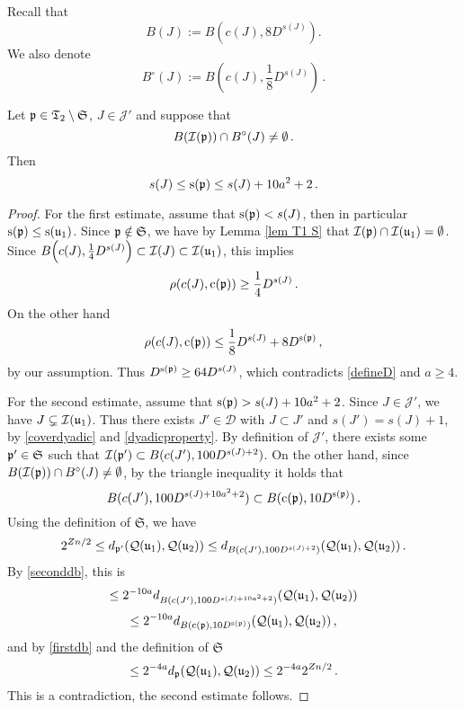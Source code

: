 {    Recall that
    \begin{equation*}
        B(J) := B(c(J), 8D^{s(J)}).
    \end{equation*}
    We also denote
    \begin{equation*}
     B^\circ{}(J) := B(c(J), \frac{1}{8}D^{s(J)})\, .    \end{equation*}


    \begin{lemma}
        \label{lem sep tree aux 2}
        Let $\mathfrak p \in \mathfrak T_2 \setminus \mathfrak{S}$, $J \in \mathcal{J}'$ and suppose that
        $$
           B(\mathcal{I}(\mathfrak p)) \cap B^\circ(J)  \ne \emptyset\,.
        $$
        Then
        $$
            s(J) \le \mathrm{s}(\mathfrak p) \le s(J) + 10a^2 + 2\,.
        $$
    \end{lemma}

    \begin{proof}
        For the first estimate, assume that $\mathrm{s}(\mathfrak p) < s(J)$, then in particular $\mathrm{s}(\mathfrak p) \le \mathrm{s}(\mathfrak u_1)$. Since $\mathfrak p \notin \mathfrak{S}$, we have by Lemma \ref{lem T1 S} that $\mathcal{I}(\mathfrak p) \cap \mathcal{I}(\mathfrak u_1) = \emptyset$.
        Since $B\Big(c(J), \frac{1}{4} D^{s(J)}\Big) \subset \mathcal{I}(J) \subset \mathcal{I}(\mathfrak u_1)$, this implies
        $$
            \rho(c(J), \mathrm{c}(\mathfrak p)) \ge \frac{1}{4}D^{s(J)}\,.
        $$
        On the other hand
        $$
            \rho(c(J), \mathrm{c}(\mathfrak p)) \le \frac{1}{8} D^{s(J)} + 8 D^{\mathrm{s}(\mathfrak p)}\,,
        $$
        by our assumption. Thus $D^{\mathrm{s}(\mathfrak p)} \ge 64 D^{s(J)}$, which contradicts \eqref{defineD} and $a \ge 4$.

        For the second estimate, assume that $\mathrm{s}(\mathfrak p) > s(J) +10a^2 + 2$. Since $J \in \mathcal{J}'$, we have $J \subsetneq \mathcal{I}(\mathfrak u_1)$. Thus there exists $J' \in \mathcal{D}$ with $J \subset J'$ and $s(J') = s(J) + 1$, by \eqref{coverdyadic} and \eqref{dyadicproperty}. By definition of $\mathcal{J}'$, there exists some $\mathfrak p' \in \mathfrak{S}$ such that $\mathcal{I}(\mathfrak p') \subset B(c(J'), 100 D^{s(J) + 2})$. On the other hand, since $B(\mathcal{I}(\mathfrak p)) \cap B^\circ(J)  \ne \emptyset$, by the triangle inequality it holds that
        $$
            B(c(J'), 100 D^{s(J) + 10a^2 + 2}) \subset B(\mathrm{c}(\mathfrak p), 10 D^{\mathrm{s}(\mathfrak p)})\,.
        $$
        Using the definition of $\mathfrak{S}$, we have
        $$
            2^{Zn/2} \le d_{\mathfrak p'}(\mathcal{Q}(\mathfrak u_1), \mathcal{Q}(\mathfrak u_2)) \le d_{B(c(J'), 100 D^{s(J) + 2})}(\mathcal{Q}(\mathfrak u_1), \mathcal{Q}(\mathfrak u_2))\,.
        $$
        By \eqref{seconddb}, this is
        $$
            \le 2^{-10a} d_{B(c(J'), 100 D^{s(J) + 10a^2 + 2})}(\mathcal{Q}(\mathfrak u_1), \mathcal{Q}(\mathfrak u_2))
        $$
        $$
            \le 2^{-10a} d_{B(\mathrm{c}(\mathfrak p), 10 D^{\mathrm{s}(\mathfrak p)})}(\mathcal{Q}(\mathfrak u_1), \mathcal{Q}(\mathfrak u_2))\,,
        $$
        and by \eqref{firstdb} and the definition of $\mathfrak{S}$
        $$
            \le 2^{-4a} d_{\mathfrak p}(\mathcal{Q}(\mathfrak u_1), \mathcal{Q}(\mathfrak u_2)) \le 2^{-4a} 2^{Zn/2}\,.
        $$
        This is a contradiction, the second estimate follows.
    \end{proof}


}
